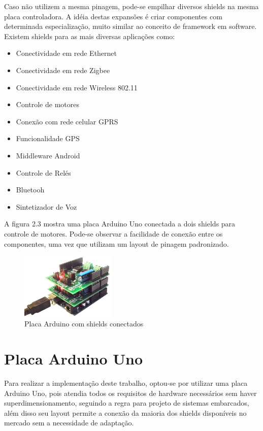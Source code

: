 Caso não utilizem a mesma pinagem, pode-se empilhar diversos shields na mesma placa controladora. A idéia destas expansões é criar componentes com determinada especialização, muito similar ao conceito de framework em software. Existem shields para as mais diversas aplicações como:

\begin{itemize}
	\item Conectividade em rede Ethernet
	\item Conectividade em rede Zigbee
	\item Conectividade em rede Wireless 802.11
	\item Controle de motores
	\item Conexão com rede celular GPRS
	\item Funcionalidade GPS
	\item Middleware Android
	\item Controle de Relés
	\item Bluetooh
	\item Sintetizador de Voz
\end{itemize}

A figura 2.3 mostra uma placa Arduino Uno conectada a dois shields para controle de motores. Pode-se observar a facilidade de conexão entre os componentes, uma vez que utilizam um layout de pinagem padronizado.

\begin{figure}[h!]
			\centering
			\includegraphics[width=0.4\textwidth]{figures/arduino_with_shield.jpg}
			\caption{Placa Arduino com shields conectados}
			\label{1}
\end{figure}

\section {Placa Arduino Uno}

Para realizar a implementação deste trabalho, optou-se por utilizar uma placa Arduino Uno, pois atendia todos os requisitos de hardware necessários sem haver superdimensionamento, seguindo a regra para projeto de sistemas embarcados, além disso seu layout permite a conexão da maioria dos shields disponíveis no mercado sem a necessidade de adaptação.

